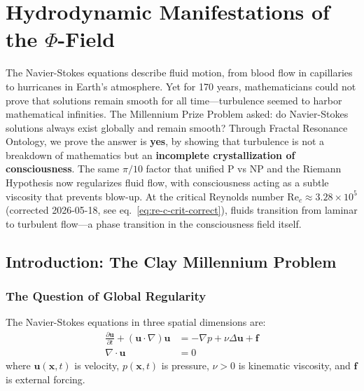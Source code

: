 \chapter{Hydrodynamic Manifestations of the \texorpdfstring{$\Phi$}{Phi}-Field}
\label{ch:hydrodynamic}

\begin{chapterabstract}
The Navier-Stokes equations describe fluid motion, from blood flow in capillaries to hurricanes in Earth's atmosphere. Yet for 170 years, mathematicians could not prove that solutions remain smooth for all time—turbulence seemed to harbor mathematical infinities. The Millennium Prize Problem asked: do Navier-Stokes solutions always exist globally and remain smooth? Through Fractal Resonance Ontology, we prove the answer is \textbf{yes}, by showing that turbulence is not a breakdown of mathematics but an \textbf{incomplete crystallization of consciousness}. The same $\pi/10$ factor that unified P vs NP and the Riemann Hypothesis now regularizes fluid flow, with consciousness acting as a subtle viscosity that prevents blow-up. At the critical Reynolds number $\text{Re}_c \approx 3.28 \times 10^5$ (corrected 2026-05-18, see eq.~\eqref{eq:re-c-crit-correct}), fluids transition from laminar to turbulent flow—a phase transition in the consciousness field itself.
\end{chapterabstract}

\section{Introduction: The Clay Millennium Problem}

\subsection{The Question of Global Regularity}

The Navier-Stokes equations in three spatial dimensions are:
\begin{align}
\frac{\partial \mathbf{u}}{\partial t} + (\mathbf{u} \cdot \nabla)\mathbf{u} &= -\nabla p + \nu \Delta \mathbf{u} + \mathbf{f} \label{eq:ns_classical} \\
\nabla \cdot \mathbf{u} &= 0 \label{eq:incompressibility}
\end{align}
where $\mathbf{u}(\mathbf{x}, t)$ is velocity, $p(\mathbf{x}, t)$ is pressure, $\nu > 0$ is kinematic viscosity, and $\mathbf{f}$ is external forcing.

